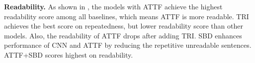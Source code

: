 \textbf{Readability.}
As shown in , 
the models with ATTF achieve the
highest readability score among all baselines, 
which means ATTF is more readable.
TRI achieves the best score on repeatedness, 
but lower readability score than other models.
Also, the readability of ATTF drops after adding TRI.
SBD enhances performance of CNN and ATTF by reducing the repetitive unreadable sentences. 
ATTF+SBD scores highest on readability.
\DIFdelbegin %
\DIFdelend \DIFaddbegin {}\DIFaddend %



